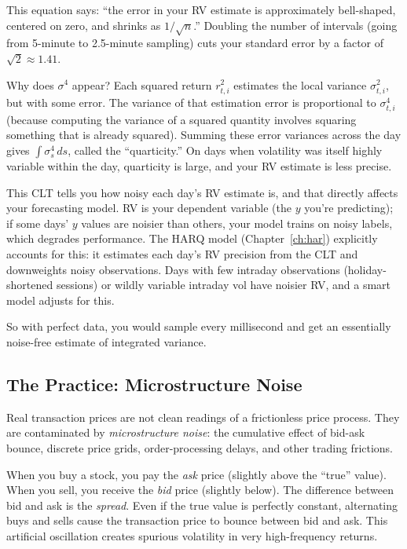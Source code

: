 \begin{intuition}
This equation says: ``the error in your RV estimate is approximately bell-shaped, centered on zero, and shrinks as $1/\sqrt{n}$.''
Doubling the number of intervals (going from 5-minute to 2.5-minute sampling) cuts your standard error by a factor of $\sqrt{2} \approx 1.41$.

Why does $\sigma^4$ appear?
Each squared return $r^2_{t,i}$ estimates the local variance $\sigma^2_{t,i}$, but with some error.
The variance of that estimation error is proportional to $\sigma^4_{t,i}$ (because computing the variance of a squared quantity involves squaring something that is already squared).
Summing these error variances across the day gives $\int \sigma^4_s\,ds$, called the ``quarticity.''
On days when volatility was itself highly variable within the day, quarticity is large, and your RV estimate is less precise.
\end{intuition}

\begin{projectconnection}
This CLT tells you how noisy each day's RV estimate is, and that directly affects your forecasting model.
RV is your dependent variable (the $y$ you're predicting); if some days' $y$ values are noisier than others, your model trains on noisy labels, which degrades performance.
The HARQ model (Chapter~\ref{ch:har}) explicitly accounts for this: it estimates each day's RV precision from the CLT and downweights noisy observations.
Days with few intraday observations (holiday-shortened sessions) or wildly variable intraday vol have noisier RV, and a smart model adjusts for this.
\end{projectconnection}

So with perfect data, you would sample every millisecond and get an essentially noise-free estimate of integrated variance.

\subsection{The Practice: Microstructure Noise}

Real transaction prices are not clean readings of a frictionless price process.
They are contaminated by \emph{microstructure noise}: the cumulative effect of bid-ask bounce, discrete price grids, order-processing delays, and other trading frictions.

\begin{prereq}
When you buy a stock, you pay the \emph{ask} price (slightly above the ``true'' value).
When you sell, you receive the \emph{bid} price (slightly below).
The difference between bid and ask is the \emph{spread}.
Even if the true value is perfectly constant, alternating buys and sells cause the transaction price to bounce between bid and ask.
This artificial oscillation creates spurious volatility in very high-frequency returns.
\end{prereq}

